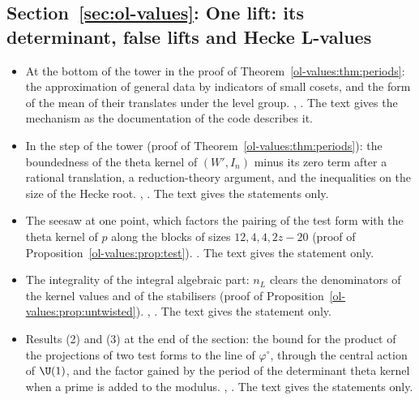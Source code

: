 \subsection*{Section~\ref{sec:ol-values}: One lift: its determinant, false lifts and Hecke L-values}
\begin{itemize}[leftmargin=2em,itemsep=1pt]
\item At the bottom of the tower in the proof of Theorem~\ref{ol-values:thm:periods}: the
  approximation of general data by indicators of small cosets, and the form of the mean of their
  translates under the level group. ,
  . The text gives the mechanism as the
  documentation of the code describes it.
\item In the step of the tower (proof of Theorem~\ref{ol-values:thm:periods}): the boundedness of
  the theta kernel of $(W',I_n)$ minus its zero term after a rational translation, a reduction-theory
  argument, and the inequalities on the size of the Hecke root.
  ,
  . The text gives the statements only.
\item The seesaw at one point, which factors the pairing of the test form with the theta kernel of
  $p$ along the blocks of sizes $12,4,4,2z-20$ (proof of Proposition~\ref{ol-values:prop:test}).
  . The text gives the statement only.
\item The integrality of the integral algebraic part: $n_L$ clears the denominators of the kernel
  values and of the stabilisers (proof of Proposition~\ref{ol-values:prop:untwisted}).
  ,
  . The text gives the
  statement only.
\item Results (2) and (3) at the end of the section: the bound for the product of the projections
  of two test forms to the line of $\varphi^\circ$, through the central action of $\U(1)$, and the
  factor gained by the period of the determinant theta kernel when a prime is added to the modulus.
  , .
  The text gives the statements only.
\end{itemize}

